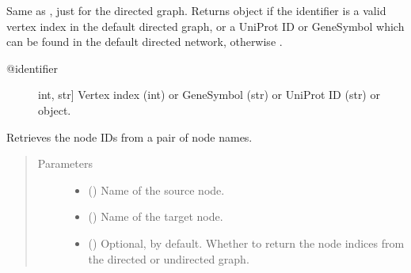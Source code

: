 \documentclass[letterpaper,10pt,english]{sphinxmanual}
\begin{document}
\begin{fulllineitems}
\begin{fulllineitems}
\begin{description}
\end{description}

\end{fulllineitems}


\begin{fulllineitems}
\label{\detokenize{reference:pypath.main.PyPath.get_node_d}}
Same as , just for the directed graph.
Returns  object if the identifier
is a valid vertex index in the default directed graph,
or a UniProt ID or GeneSymbol which can be found in the
default directed network, otherwise .
\begin{description}
\item[{@identifier}] \leavevmode{[}int, str{]}
Vertex index (int) or GeneSymbol (str) or UniProt ID (str) or
 object.

\end{description}

\end{fulllineitems}


\begin{fulllineitems}
\label{\detokenize{reference:pypath.main.PyPath.get_node_pair}}
Retrieves the node IDs from a pair of node names.
\begin{quote}\begin{description}
\item[{Parameters}] \leavevmode\begin{itemize}
\item {} 
 () \textendash{} Name of the source node.

\item {} 
 () \textendash{} Name of the target node.

\item {} 
 () \textendash{} Optional,  by default. Whether to return the node
indices from the directed or undirected graph.


\end{itemize}
\end{description}
\end{quote}
\end{fulllineitems}
\end{fulllineitems}
\end{document}
